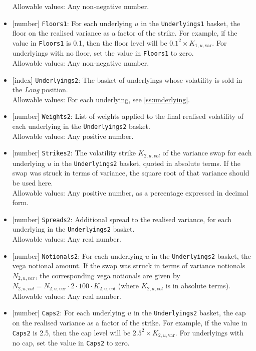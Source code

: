 \begin{itemize}
  Allowable values: Any non-negative number.
  \item{}[number] \lstinline!Floors1!: For each underlying $u$ in the \lstinline!Underlyings1! basket, the floor on the realised
  variance as a factor of the strike. For example, if the value in \lstinline!Floors1! is 0.1, then the floor level will
  be $0.1^2 \times K_{1,u,\text{var}}$. For underlyings with no floor, set the value in \lstinline!Floors1! to zero. \\
  Allowable values: Any non-negative number.
  \item{}[index] \lstinline!Underlyings2!: The basket of underlyings whose volatility is sold in the \emph{Long} position.\\
  Allowable values: For each underlying, see \ref{ss:underlying}.
  \item{}[number] \lstinline!Weights2!: List of weights applied to the final realised volatility of each underlying
  in the \lstinline!Underlyings2! basket. \\
  Allowable values: Any positive number.
  \item{}[number] \lstinline!Strikes2!: The volatility strike $K_{2,u,vol}$ of the variance swap for each underlying $u$
  in the \lstinline!Underlyings2! basket, quoted in absolute terms. If the swap was
  struck in terms of variance, the square root of that variance should be used here.\\
  Allowable values: Any positive number, as a percentage expressed in decimal form.
  \item{}[number] \lstinline!Spreads2!: Additional spread to the realised variance, for each underlying in the
  \lstinline!Underlyings2! basket. \\
  Allowable values: Any real number.
  \item{}[number] \lstinline!Notionals2!: For each underlying $u$ in the \lstinline!Underlyings2! basket, the vega notional amount.
  If the swap was struck in terms of variance notionals $N_{2,u,var}$, the corresponding vega notionals are given by
  $N_{2,u,vol} = N_{2,u,var} \cdot 2 \cdot 100 \cdot K_{2,u,vol}$ (where $K_{2,u,vol}$ is in
  absolute terms). \\
  Allowable values: Any real number.
  \item{}[number] \lstinline!Caps2!: For each underlying $u$ in the \lstinline!Underlyings2! basket, the cap on the realised variance
  as a factor of the strike. For example, if the value in  \lstinline!Caps2! is 2.5, then the cap level will be
  $2.5^2 \times K_{2,u,\text{var}}$. For underlyings with no cap, set the value in \lstinline!Caps2! to zero. \\

\end{itemize}
